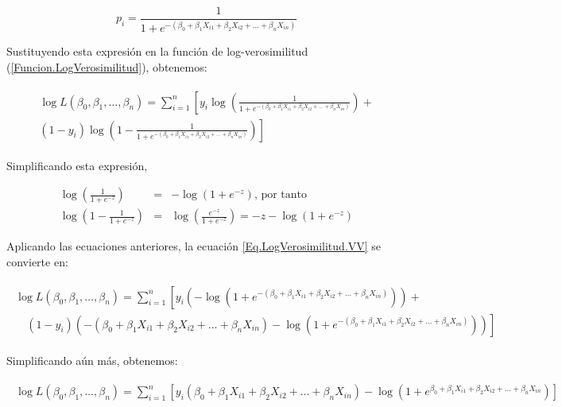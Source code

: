 \documentclass[a4paper]{report} %
\begin{document}
\begin{equation}\label{Eq.Logit1.Multi}
p_i = \frac{1}{1 + e^{-(\beta_0 + \beta_1 X_{i1} + \beta_2 X_{i2} + \ldots + \beta_n X_{in})}}
\end{equation}

Sustituyendo esta expresi\'on en la funci\'on de log-verosimilitud (\ref{Funcion.LogVerosimilitud}), obtenemos:

\begin{eqnarray}\label{Eq.LogVerosimilitud.VV}
\begin{array}{l}
\log L(\beta_0, \beta_1, \ldots, \beta_n) = \sum_{i=1}^{n} \left[ y_i \log \left( \frac{1}{1 + e^{-(\beta_0 + \beta_1 X_{i1} + \beta_2 X_{i2} + \ldots + \beta_n X_{in})}} \right) + \right. \\
 \left. (1 - y_i) \log \left( 1 - \frac{1}{1 + e^{-(\beta_0 + \beta_1 X_{i1} + \beta_2 X_{i2} + \ldots + \beta_n X_{in})}} \right) \right]
\end{array}
\end{eqnarray}

Simplificando esta expresi\'on,

\begin{eqnarray}
\log \left( \frac{1}{1 + e^{-z}} \right) &=& -\log(1 + e^{-z})\textrm{, por tanto}\\
\log \left( 1 - \frac{1}{1 + e^{-z}} \right) &=& \log \left( \frac{e^{-z}}{1 + e^{-z}} \right) = -z - \log(1 + e^{-z})
\end{eqnarray}

Aplicando las ecuaciones anteriores, la ecuaci\'on \ref{Eq.LogVerosimilitud.VV} se convierte en:

\begin{eqnarray*}
\begin{array}{l}
\log L(\beta_0, \beta_1, \ldots, \beta_n) = \sum_{i=1}^{n} \left[ y_i (-\log(1 + e^{-(\beta_0 + \beta_1 X_{i1} + \beta_2 X_{i2} + \ldots + \beta_n X_{in})})) + \right. \nonumber \\
 \quad \left. (1 - y_i) \left( -(\beta_0 + \beta_1 X_{i1} + \beta_2 X_{i2} + \ldots + \beta_n X_{in}) - \log(1 + e^{-(\beta_0 + \beta_1 X_{i1} + \beta_2 X_{i2} + \ldots + \beta_n X_{in})}) \right) \right]
\end{array}
\end{eqnarray*}

Simplificando a\'un m\'as, obtenemos:

\begin{eqnarray}\label{Eq.LogVerosimilitud.Final}
\begin{array}{r}
\log L(\beta_0, \beta_1, \ldots, \beta_n) =\sum_{i=1}^{n} \left[ y_i (\beta_0 + \beta_1 X_{i1} + \beta_2 X_{i2} + \ldots + \beta_n X_{in}) -\log(1 + e^{\beta_0 + \beta_1 X_{i1} + \beta_2 X_{i2} + \ldots + \beta_n X_{in}}) \right]
\end{array}
\end{eqnarray}
\end{document}
